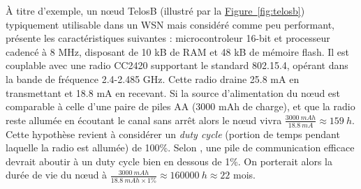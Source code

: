 \documentclass[]{report}
\newcommand{\wordlink}[2]{\hyperref[#2]{#1~\ref{#2}}}
\begin{document}
À titre d'exemple, un nœud TelosB (illustré par la \wordlink{Figure}{fig:telosb}) typiquement utilisable dans un WSN mais considéré comme peu performant, présente les caractéristiques suivantes : microcontroleur 16-bit et processeur cadencé à 8 MHz, disposant de 10 kB de RAM et 48 kB de mémoire flash. Il est couplable avec une radio CC2420 supportant le standard 802.15.4, opérant dans la bande de fréquence 2.4-2.485 GHz. Cette radio draine 25.8 mA en transmettant et 18.8 mA en recevant. Si la source d'alimentation du nœud est comparable à celle d'une paire de piles AA (3000 mAh de charge), et que la radio reste allumée en écoutant le canal sans arrêt alors le nœud vivra $\frac{3000\: mAh}{18.8\: mA} \approx 159\: h$. Cette hypothèse revient à considérer un \textit{duty cycle} (portion de temps pendant laquelle la radio est allumée) de 100\%. Selon \cite{stack-IoT}, une pile de communication efficace devrait aboutir à un duty cycle bien en dessous de 1\%. On porterait alors la durée de vie du nœud à $\frac{3000\:mAh}{18.8\: mAh \times 1\%} \approx 160000\:h \approx 22 $ mois.\\

\newpage
\end{document}

